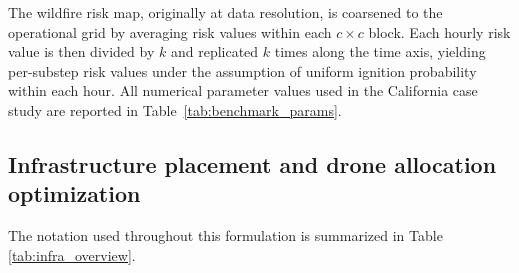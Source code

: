 \documentclass[pdflatex,sn-mathphys-num]{sn-jnl}%
\theoremstyle{thmstyleone}%
\theoremstyle{thmstyletwo}%
\theoremstyle{thmstylethree}%
\newcommand{\set}[1]{\mathcal{#1}}
\begin{document}
The wildfire risk map, originally at data resolution, is coarsened to the operational grid by averaging risk values within each $c \times c$ block. Each hourly risk value is then divided by $k$ and replicated $k$ times along the time axis, yielding per-substep risk values under the assumption of uniform ignition probability within each hour. All numerical parameter values used in the California case study are reported in Table~\ref{tab:benchmark_params}.





\subsection*{Infrastructure placement and drone allocation optimization}
The notation used throughout this formulation is summarized in Table \ref{tab:infra_overview}.




\end{document}
